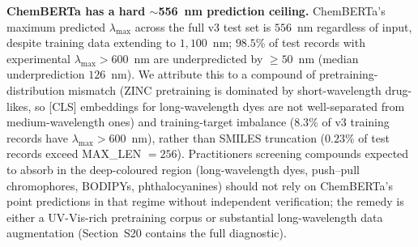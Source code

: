 \documentclass[journal=jcisd8,manuscript=article]{achemso}
\newcommand{\added}[1]{{\color{addedblue}#1}}
\begin{document}
\added{\textbf{ChemBERTa has a hard $\sim$556~nm prediction ceiling.} ChemBERTa's maximum predicted $\lambda_{\max}$ across the full v3 test set is $556$~nm regardless of input, despite training data extending to $1{,}100$~nm; $98.5$\% of test records with experimental $\lambda_{\max} > 600$~nm are underpredicted by $\geq 50$~nm (median underprediction $126$~nm). We attribute this to a compound of pretraining-distribution mismatch (ZINC pretraining is dominated by short-wavelength drug-likes, so [CLS] embeddings for long-wavelength dyes are not well-separated from medium-wavelength ones) and training-target imbalance ($8.3$\% of v3 training records have $\lambda_{\max} > 600$~nm), rather than SMILES truncation ($0.23$\% of test records exceed MAX\_LEN $= 256$). Practitioners screening compounds expected to absorb in the deep-coloured region (long-wavelength dyes, push--pull chromophores, BODIPYs, phthalocyanines) should not rely on ChemBERTa's point predictions in that regime without independent verification; the remedy is either a UV-Vis-rich pretraining corpus or substantial long-wavelength data augmentation (Section~S20 contains the full diagnostic).}
\end{document}
